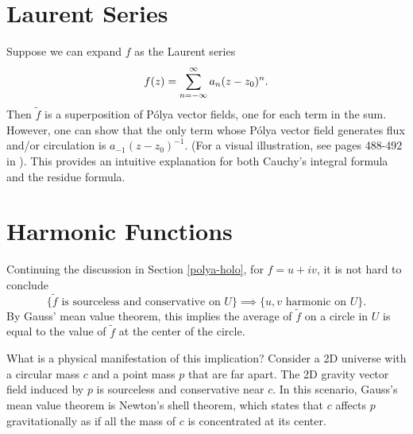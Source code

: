 \section{Laurent Series}
Suppose we can expand $f$ as the Laurent series
\[
    f(z) = \sum_{n = -\infty}^\infty a_n (z-z_0)^n.
\]
Then $\tilde{f}$ is a superposition of P\'olya vector fields, one for each term in the sum. However, one can show that the only term whose P\'olya vector field generates flux and/or circulation is $a_{-1} (z-z_0)^{-1}$. (For a visual illustration, see pages 488-492 in \cite{Nee97}). This provides an intuitive explanation for both Cauchy's integral formula and the residue formula.

\section{Harmonic Functions}
Continuing the discussion in Section \ref{polya-holo}, for $f = u + iv$, it is not hard to conclude
\[
    \{\tilde{f} \text{ is sourceless and conservative on } U\} \implies \{u, v \text{ harmonic on } U\}.
\]
By Gauss' mean value theorem, this implies the average of $\tilde{f}$ on a circle in $U$ is equal to the value of $\tilde{f}$ at the center of the circle.

What is a physical manifestation of this implication? Consider a 2D universe with a circular mass $c$ and a point mass $p$ that are far apart. The 2D gravity vector field induced by $p$ is sourceless and conservative near $c$. In this scenario, Gauss's mean value theorem is Newton's shell theorem, which states that $c$ affects $p$ gravitationally as if all the mass of $c$ is concentrated at its center.

